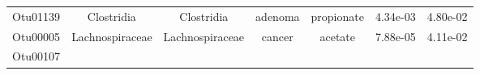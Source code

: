 \documentclass[11pt,]{article}
\begin{document}
\begin{longtable}[]{@{}ccccccc@{}}
\begin{minipage}[t]{0.09\columnwidth}\centering\strut
Otu01139\strut
\end{minipage} & \begin{minipage}[t]{0.17\columnwidth}\centering\strut
Clostridia\strut
\end{minipage} & \begin{minipage}[t]{0.17\columnwidth}\centering\strut
Clostridia\strut
\end{minipage} & \begin{minipage}[t]{0.09\columnwidth}\centering\strut
adenoma\strut
\end{minipage} & \begin{minipage}[t]{0.11\columnwidth}\centering\strut
propionate\strut
\end{minipage} & \begin{minipage}[t]{0.09\columnwidth}\centering\strut
4.34e-03\strut
\end{minipage} & \begin{minipage}[t]{0.09\columnwidth}\centering\strut
4.80e-02\strut
\end{minipage}\tabularnewline
\begin{minipage}[t]{0.09\columnwidth}\centering\strut
Otu00005\strut
\end{minipage} & \begin{minipage}[t]{0.17\columnwidth}\centering\strut
Lachnospiraceae\strut
\end{minipage} & \begin{minipage}[t]{0.17\columnwidth}\centering\strut
Lachnospiraceae\strut
\end{minipage} & \begin{minipage}[t]{0.09\columnwidth}\centering\strut
cancer\strut
\end{minipage} & \begin{minipage}[t]{0.11\columnwidth}\centering\strut
acetate\strut
\end{minipage} & \begin{minipage}[t]{0.09\columnwidth}\centering\strut
7.88e-05\strut
\end{minipage} & \begin{minipage}[t]{0.09\columnwidth}\centering\strut
4.11e-02\strut
\end{minipage}\tabularnewline
\begin{minipage}[t]{0.09\columnwidth}\centering\strut
Otu00107\strut
\end{minipage} & \begin{minipage}[t]{0.17\columnwidth}\centering\strut

\end{minipage}
\end{longtable}
\end{document}
